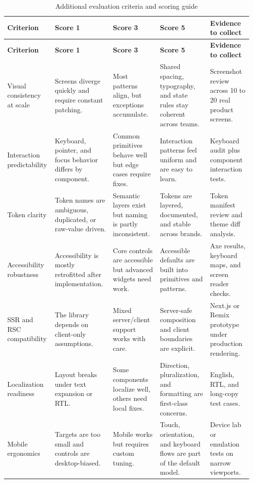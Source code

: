 \begin{longtable}{@{}p{}p{}p{}p{}p{}@{}}
\caption{Additional evaluation criteria and scoring guide}\label{tab:appendix-a-criteria}\\
\toprule
\textbf{Criterion} & \textbf{Score 1} & \textbf{Score 3} & \textbf{Score 5} & \textbf{Evidence to collect} \\
\midrule
\endfirsthead
\toprule
\textbf{Criterion} & \textbf{Score 1} & \textbf{Score 3} & \textbf{Score 5} & \textbf{Evidence to collect} \\
\midrule
\endhead
\bottomrule
\endfoot
Visual consistency at scale & Screens diverge quickly and require constant patching. & Most patterns align, but exceptions accumulate. & Shared spacing, typography, and state rules stay coherent across teams. & Screenshot review across 10 to 20 real product screens. \\
Interaction predictability & Keyboard, pointer, and focus behavior differs by component. & Common primitives behave well but edge cases require fixes. & Interaction patterns feel uniform and are easy to learn. & Keyboard audit plus component interaction tests. \\
Token clarity & Token names are ambiguous, duplicated, or raw-value driven. & Semantic layers exist but naming is partly inconsistent. & Tokens are layered, documented, and stable across brands. & Token manifest review and theme diff analysis. \\
Accessibility robustness & Accessibility is mostly retrofitted after implementation. & Core controls are accessible but advanced widgets need work. & Accessible defaults are built into primitives and patterns. & Axe results, keyboard maps, and screen reader checks. \\
SSR and RSC compatibility & The library depends on client-only assumptions. & Mixed server/client support works with care. & Server-safe composition and client boundaries are explicit. & Next.js or Remix prototype under production rendering. \\
Localization readiness & Layout breaks under text expansion or RTL. & Some components localize well, others need local fixes. & Direction, pluralization, and formatting are first-class concerns. & English, RTL, and long-copy test cases. \\
Mobile ergonomics & Targets are too small and controls are desktop-biased. & Mobile works but requires custom tuning. & Touch, orientation, and keyboard flows are part of the default model. & Device lab or emulation tests on narrow viewports. \\

\end{longtable}
